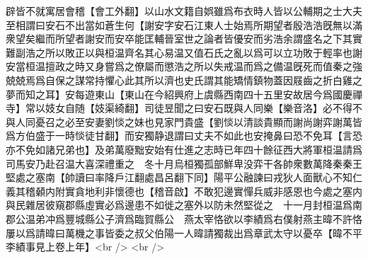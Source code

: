 辟皆不就寓居會稽【會工外翻】以山水文籍自娯雖爲布衣時人皆以公輔期之士大夫至相謂曰安石不出當如蒼生何【謝安字安石江東人士始焉所期望者殷浩浩旣無以滿衆望矣繼而所望者謝安而安卒能匡輔晉室世之論者皆優安而劣浩余謂盛名之下其實難副浩之所以敗正以與桓温齊名其心易温又值石氏之亂以爲可以立功敗于輕率也謝安當桓温擅政之時又身嘗爲之僚屬而懲浩之所以失戒温而爲之備温旣死而值秦之強兢兢焉爲自保之謀常持懼心此其所以濟也史氏謂其能矯情鎮物蓋因屐齒之折白雞之夢而知之耳】安每遊東山【東山在今紹興府上虞縣西南四十五里安故居今爲國慶禪寺】常以妓女自随【妓渠綺翻】司徒昱聞之曰安石既與人同樂【樂音洛】必不得不與人同憂召之必至安妻劉惔之妹也見家門貴盛【劉惔以清談貴顯而謝尚謝弈謝萬皆爲方伯盛于一時惔徒甘翻】而安獨静退謂曰丈夫不如此也安掩鼻曰恐不免耳【言恐亦不免如諸兄弟也】及弟萬廢黜安始有仕進之志時已年四十餘征西大將軍桓温請爲司馬安乃赴召温大喜深禮重之　冬十月烏桓獨孤部鮮卑没弈干各帥衆數萬降秦秦王堅處之塞南【帥讀曰率降戶江翻處昌呂翻下同】陽平公融諫曰戎狄人面獸心不知仁義其稽顙内附實貪地利非懷德也【稽音啟】不敢犯邊實憚兵威非感恩也今處之塞内與民雜居彼窺郡縣虛實必爲邊患不如徙之塞外以防未然堅從之　十一月封桓温爲南郡公温弟冲爲豐城縣公子濟爲臨賀縣公　燕太宰恪欲以李績爲右僕射燕主暐不許恪屢以爲請暐曰萬機之事皆委之叔父伯陽一人暐請獨裁出爲章武太守以憂卒【暐不平李績事見上卷上年】<br />
<br />
